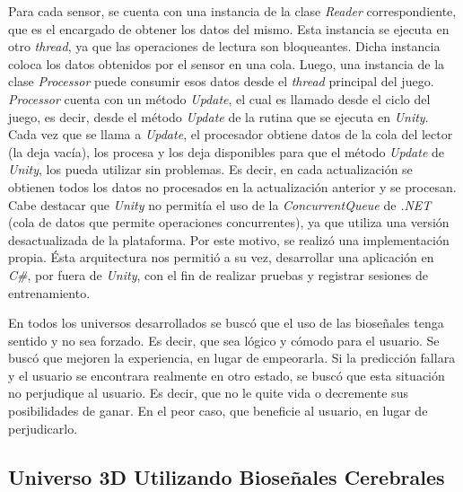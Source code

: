 Para cada sensor, se cuenta con una instancia de la clase \emph{Reader} correspondiente, que es el encargado de obtener los datos del mismo. Esta instancia se ejecuta en otro \emph{thread}, ya que las operaciones de lectura son bloqueantes. Dicha instancia coloca los datos obtenidos por el sensor en una cola. Luego, una instancia de la clase \emph{Processor} puede consumir esos datos desde el \emph{thread} principal del juego. \emph{Processor} cuenta con un método \emph{Update}, el cual es llamado desde el ciclo del juego, es decir, desde el método \emph{Update} de la rutina que se ejecuta en \emph{Unity}. Cada vez que se llama a \emph{Update}, el procesador obtiene datos de la cola del lector (la deja vacía), los procesa y los deja disponibles para que el método \emph{Update} de \emph{Unity}, los pueda utilizar sin problemas. Es decir, en cada actualización se obtienen todos los datos no procesados en la actualización anterior y se procesan. Cabe destacar que \emph{Unity} no permitía el uso de la \emph{ConcurrentQueue} de \emph{.NET} (cola de datos que permite operaciones concurrentes), ya que utiliza una versión desactualizada de la plataforma. Por este motivo, se realizó una implementación propia. Ésta arquitectura nos permitió a su vez, desarrollar una aplicación en \emph{C\#}, por fuera de \emph{Unity}, con el fin de realizar pruebas y registrar sesiones de entrenamiento.

En todos los universos desarrollados se buscó que el uso de las bioseñales tenga sentido y no sea forzado. Es decir, que sea lógico y cómodo para el usuario. Se buscó que mejoren la experiencia, en lugar de empeorarla. Si la predicción fallara y el usuario se encontrara realmente en otro estado, se buscó que esta situación no perjudique al usuario. Es decir, que no le quite vida o decremente sus posibilidades de ganar. En el peor caso, que beneficie al usuario, en lugar de perjudicarlo.

\subsection{Universo 3D Utilizando Bioseñales Cerebrales}

